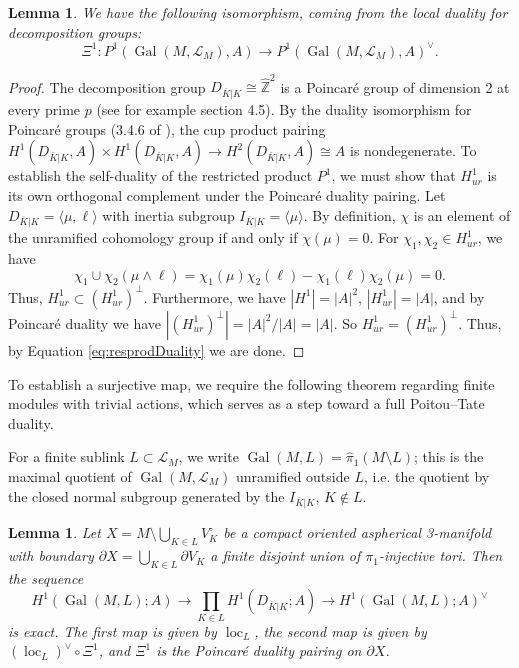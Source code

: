 \documentclass{amsart}
\theoremstyle{plain}
\theoremstyle{definition}
\theoremstyle{plain}
\theoremstyle{plain}
\theoremstyle{plain}
\newtheorem{lemma}[theorem]{Lemma}
\theoremstyle{remark}
\theoremstyle{remark}
\theoremstyle{plain}
\theoremstyle{definition}
\theoremstyle{plain}
\DeclareMathOperator{\Gal}{\mathrm{Gal}}
\DeclareMathOperator{\loc}{\mathrm{loc}}
\theoremstyle{plain}
\theoremstyle{plain}
\numberwithin{equation}{section}
\begin{document}
\begin{lemma}\label{lma:localduality}
We have the following isomorphism, coming from the local duality for decomposition groups:
\begin{equation}
    \Xi^1: P^1(\Gal(M, \mathcal{L}_M), A) \to P^1(\Gal(M, \mathcal{L}_M), A)^\vee.
\end{equation}
\end{lemma}

\begin{proof}
The decomposition group $D_{\overline{K}|K} \cong \widehat{\mathbb{Z}}^2$ is a Poincar\'e group of dimension 2 at every prime $p$ (see for example \cite{serre} section 4.5). By the duality isomorphism for Poincar\'e groups (3.4.6 of \cite{neukirch2013cohomology}), the cup product pairing $H^1(D_{\overline{K}|K}, A) \times H^1(D_{\overline{K}|K}, A) \to H^2(D_{\overline{K}|K}, A) \cong A$ is nondegenerate. To establish the self-duality of the restricted product $P^1$, we must show that $H^1_{ur}$ is its own orthogonal complement under the Poincar\'e duality pairing. Let $D_{\overline{K}|K} = \langle \mu, \ell \rangle$ with inertia subgroup $I_{\overline{K}|K} = \langle \mu \rangle$. By definition, $\chi$ is an element of the unramified cohomology group if and only if $\chi(\mu) = 0$. For $\chi_1, \chi_2 \in H^1_{ur}$, we have
\begin{equation}
    \chi_1 \cup \chi_2(\mu \wedge \ell) = \chi_1(\mu)\chi_2(\ell) - \chi_1(\ell)\chi_2(\mu) = 0.
\end{equation}
Thus, $H^1_{ur} \subset (H^1_{ur})^\perp$. Furthermore, we have $|H^1| = |A|^2$, $|H^1_{ur}| = |A|$, and by Poincar\'e duality we have $|(H^1_{ur})^\perp| = |A|^2/|A| = |A|$. So $H^1_{ur} = (H^1_{ur})^\perp$. Thus, by Equation \ref{eq:resprodDuality} we are done.
\end{proof}

To establish a surjective map, we require the following theorem regarding finite modules with trivial actions, which serves as a step toward a full Poitou--Tate duality. 

\medskip

For a finite sublink $L \subset \mathcal L_M$, we write $\Gal(M, L) = \widehat\pi_1(M \setminus L)$; this is the maximal quotient of $\Gal(M, \mathcal L_M)$ unramified outside $L$, i.e. the quotient by the closed normal subgroup generated by the $I_{\overline K|K}$, $K \notin L$.

\begin{lemma}\label{lma:lefschetz}
Let $X = M \setminus \bigcup_{K \in L}V_K^{\circ}$ be a compact oriented aspherical 3-manifold with boundary $\partial X = \bigcup_{K \in L}\partial V_K$ a finite disjoint union of $\pi_1$-injective tori. Then the sequence
\begin{equation}\label{eq:58}
    H^1(\Gal(M, L); A) \to \prod_{K \in L}H^1(D_{\overline{K}|K}; A) \to H^1(\Gal(M, L); A)^\vee
\end{equation}
is exact. The first map is given by $\loc_L$, the second map is given by $(\loc_L)^\vee \circ \Xi^1$, and $\Xi^1$ is the Poincar\'e duality pairing on $\partial X$.
\end{lemma}
\end{document}
